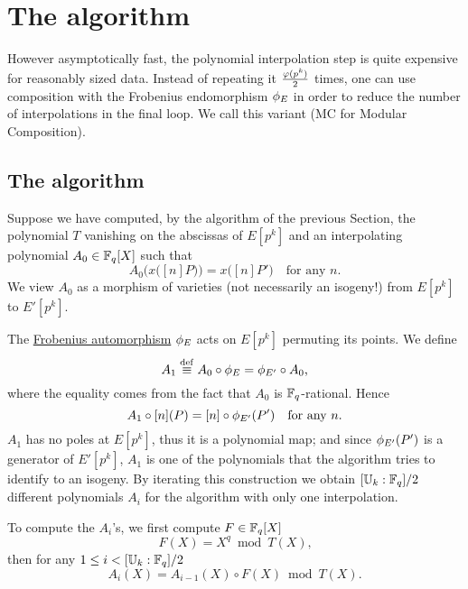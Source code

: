 

\section{The algorithm }
\label{sec:C2-AS-FI-MC}

However asymptotically fast, the polynomial interpolation step is
quite expensive for reasonably sized data. Instead of repeating it
$\frac{\varphi(p^k)}{2}$ times, one can use composition with the
Frobenius endomorphism $\phi_E$ in order to reduce the number of
interpolations in the final loop. We call this variant \ctwoasfimc{} (MC
for Modular Composition).

\subsection{The algorithm}
Suppose we have computed, by the algorithm of the previous Section,
the polynomial $T$ vanishing on the abscissas of $E[p^k]$ and an
interpolating polynomial $A_0\in\mathbb{F}_q[X]$ such that
\begin{equation*}
  A_0\bigl(x\bigl([n]P\bigr)\bigr) = x\bigl([n]P'\bigr)
  \quad\text{for any $n$.}
\end{equation*}
We view $A_0$ as a morphism of varieties (not necessarily an isogeny!)
from $E[p^k]$ to $E'[p^k]$.

The \hyperref[sec:curves-over-finite]{Frobenius automorphism}
$\phi_E$ acts on $E[p^k]$ permuting its points. We define
\begin{equation}
  \label{eq:183}
  A_1\overset{\mathrm{def}}{\equiv} A_0\circ\phi_E = \phi_{E'}\circ A_0
  \text{,}
\end{equation}
where the equality comes from the fact that $A_0$ is
$\mathbb{F}_q$-rational. Hence
\begin{equation*}
  A_1\circ[n](P) = [n]\circ\phi_{E'}(P')
  \quad\text{for any $n$.}
\end{equation*}
$A_1$ has no poles at $E[p^k]$, thus it is a polynomial map; and since
$\phi_{E'}(P')$ is a generator of $E'[p^k]$, $A_1$ is one of the
polynomials that the algorithm \ctwo{} tries to identify to an isogeny. By
iterating this construction we obtain $[\mathbb{U}_k:\mathbb{F}_q]/2$ different
polynomials $A_i$ for the algorithm \ctwo{} with only one interpolation.

To compute the $A_i$'s, we first compute $F\in\mathbb{F}_q[X]$
\begin{equation}
  \label{eq:frob}
  F(X) = X^q \bmod T(X)
  \text{,}
\end{equation}
then for any $1\le i<[\mathbb{U}_k:\mathbb{F}_q]/2$
\begin{equation}
  \label{eq:modcomp}
  A_i(X) = A_{i-1}(X)\circ F(X) \bmod T(X)\text{.}
\end{equation}

